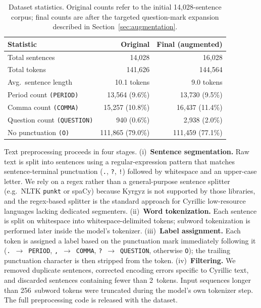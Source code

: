 \documentclass[manuscript, review]{acmart}
\begin{document}
\begin{table}[t]
\caption{Dataset statistics. Original counts refer to the initial 14{,}028-sentence corpus; final counts are after the targeted question-mark expansion described in Section~\ref{sec:augmentation}.}
\label{tab:dataset}
\begin{tabular}{lrr}
\toprule
\textbf{Statistic} & \textbf{Original} & \textbf{Final (augmented)} \\
\midrule
Total sentences            & 14{,}028      & 16{,}028 \\
Total tokens               & 141{,}626     & 144{,}564 \\
Avg.\ sentence length      & 10.1 tokens   & 9.0 tokens \\
\midrule
Period count \texttt{(PERIOD)}   & 13{,}564 (9.6\%)  & 13{,}730 (9.5\%) \\
Comma count \texttt{(COMMA)}     & 15{,}257 (10.8\%) & 16{,}437 (11.4\%) \\
Question count \texttt{(QUESTION)} & 940 (0.6\%)     & 2{,}938 (2.0\%) \\
No punctuation \texttt{(O)}      & 111{,}865 (79.0\%) & 111{,}459 (77.1\%) \\
\bottomrule
\end{tabular}
\end{table}

Text preprocessing proceeds in four stages. (i)~\textbf{Sentence segmentation.} Raw text is split into sentences using a regular-expression pattern that matches sentence-terminal punctuation (\texttt{.}, \texttt{?}, \texttt{!}) followed by whitespace and an upper-case letter. We rely on a regex rather than a general-purpose sentence splitter (e.g.\ NLTK \texttt{punkt} or spaCy) because Kyrgyz is not supported by those libraries, and the regex-based splitter is the standard approach for Cyrillic low-resource languages lacking dedicated segmenters. (ii)~\textbf{Word tokenization.} Each sentence is split on whitespace into whitespace-delimited tokens; subword tokenization is performed later inside the model's tokenizer. (iii)~\textbf{Label assignment.} Each token is assigned a label based on the punctuation mark immediately following it (\texttt{.}~$\rightarrow$~\texttt{PERIOD}, \texttt{,}~$\rightarrow$~\texttt{COMMA}, \texttt{?}~$\rightarrow$~\texttt{QUESTION}, otherwise \texttt{O}); the trailing punctuation character is then stripped from the token. (iv)~\textbf{Filtering.} We removed duplicate sentences, corrected encoding errors specific to Cyrillic text, and discarded sentences containing fewer than 2~tokens. Input sequences longer than 256~subword tokens were truncated during the model's own tokenizer step. The full preprocessing code is released with the dataset.
\end{document}
